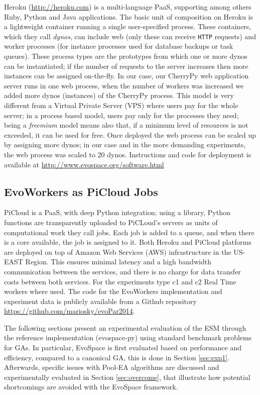 Heroku (\url{http://heroku.com}) is a multi-language PaaS, supporting among others Ruby, Python and Java applications. The basic unit of composition on
Heroku is a lightweight container running a single user-specified
process. These containers, which they call {\em dynos}, can include web
(only these can receive {\tt HTTP} requests) and worker processes
(for instance processes used for database backups or task queues).
These  process types are the prototypes from which one or more dynos 
can be instantiated; if the number of requests to the server increases then 
more instances can be assigned on-the-fly. In our case, our CherryPy 
web application server runs in one web process, when the number 
of workers was increased we added more dynos (instances) of the 
CherryPy process. This model is very different from a Virtual Private Server (VPS) where users pay for the whole server; in a process based model, users pay only for the processes they need; being a {\em freemium} model means also that, if a minimum level of resources is not exceeded, it can be used for
free. 
Once deployed the web process can be scaled up by assigning more dynos;
in our case and in the more demanding experiments, the web process was scaled to 20 dynos. Instructions and code for deployment is available at \url{http://www.evospace.org/software.html} 


\subsection{EvoWorkers as PiCloud Jobs}
PiCloud is a PaaS, with deep Python integration; 
using a library, Python functions are transparently uploaded to PiCLoud's 
servers as units of computational work they call jobs. 
Each job is added to a queue, and when there is a core available, 
the job is assigned to it. Both Heroku and PiCloud 
platforms are deployed on top of Amazon Web Services (AWS) 
infrastructure in the US-EAST Region. This ensures minimal 
latency and a high bandwidth communication between the services, 
and there is no charge for data transfer costs between both services.
For the experiments type c1 and c2 Real Time workers where used.  
The code for the EvoWorkers implementation and experiment data is publicly available from a Github repository \url{https://github.com/mariosky/evoPar2014}. 

The following sections present an experimental evaluation of the ESM through the reference implementation (evospace-py) using standard benchmark problems for GAs.
In particular, EvoSpace is first evaluated based on performance and efficiency, compared to a canonical GA, this is done
in Section \ref{sec:exp1}.
Afterwards, specific issues with Pool-EA algorithms are discussed and experimentally evaluated in Section \ref{sec:overcome},
that illustrate how potential shortcomings are avoided with the EvoSpace framework.


